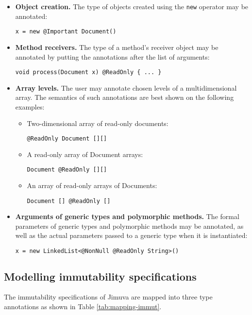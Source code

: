 \documentclass{pracamgr}
\theoremstyle{break}
\theoremstyle{break}
\theoremstyle{break}
\begin{document}
\begin{itemize}
\item \textbf{Object creation.} The type of objects created using the
  \texttt{new} operator may be annotated:
  \begin{center} 
    \texttt{x = new @Important Document()}
  \end{center}
\item \textbf{Method receivers.} The type of a method's receiver
  object may be annotated by putting the annotations after the list of
  arguments:
  \begin{center} 
    \texttt{void process(Document x) @ReadOnly \{ ... \}}
  \end{center}
\item \textbf{Array levels.} The user may annotate chosen levels of a
  multidimensional array. The semantics of such annotations are best
  shown on the following examples:
  \begin{itemize}
  \item Two-dimensional array of read-only documents: 
    \begin{center}
      \texttt{@ReadOnly Document [][]}
    \end{center}
  \item A read-only array of Document arrays:
    \begin{center}
      \texttt{Document @ReadOnly [][]}
    \end{center}
  \item An array of read-only arrays of Documents:
    \begin{center}
      \texttt{Document [] @ReadOnly []}
    \end{center}
  \end{itemize}
\item \textbf{Arguments of generic types and polymorphic methods.} The
  formal parameters of generic types and polymorphic methods may be
  annotated, as well as the actual parameters passed to a generic type
  when it is instantiated:
  \begin{center}
    \texttt{x = new LinkedList<@NonNull @ReadOnly String>()}
  \end{center}
\end{itemize}

\subsection{Modelling immutability specifications}

The immutability specifications of Jimuva are mapped into three type
annotations as shown in Table \ref{tab:mapping-immut}. 
\end{document}
